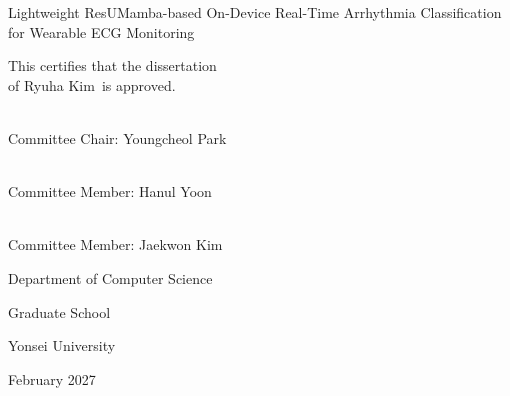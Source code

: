 \documentclass[a4paper,11pt]{report}
\title{\txtTitle}
\author{\txtAuthor}
\date{\txtDate}
\newcommand{\txtTitle}{Lightweight ResUMamba-based On-Device Real-Time Arrhythmia Classification for Wearable ECG Monitoring}
\newcommand{\txtAuthor}{Ryuha Kim}
\newcommand{\txtDate}{February 2027}
\newcommand{\txtThesisName}{Dissertation}
\begin{document}
\maketitle
\pagestyle{plain}
\baselineskip 8.5mm

\newpage
\thispagestyle{empty}
\null
\begin{center}
  \vskip -1.8cm
  {\fontsize{13pt}{13pt}\selectfont \txtTitle}

  \vskip 1.2cm
  {\fontsize{13pt}{13pt}\selectfont
  This certifies that the \MakeLowercase{\txtThesisName} \\[0.3cm]
  of \txtAuthor \ is approved.\par}

  \vskip 1.0cm
  {\fontsize{12pt}{12pt}\selectfont \underline{\hskip 7cm}}\\
  {\fontsize{12pt}{12pt}\selectfont Committee Chair: Youngcheol Park}

  \vskip 0.8cm
  {\fontsize{12pt}{12pt}\selectfont \underline{\hskip 7cm}}\\
  {\fontsize{12pt}{12pt}\selectfont Committee Member: Hanul Yoon}

  \vskip 0.8cm
  {\fontsize{12pt}{12pt}\selectfont \underline{\hskip 7cm}}\\
  {\fontsize{12pt}{12pt}\selectfont Committee Member: Jaekwon Kim}

  \vskip 1.4cm
  {\fontsize{13pt}{22pt}\selectfont
  Department of Computer Science \par
  Graduate School \par
  Yonsei University \par
  \txtDate \par
  }
\end{center}
\par
\clearpage

\pagestyle{plain}
 

\clearpage 
{} 
\end{document}
